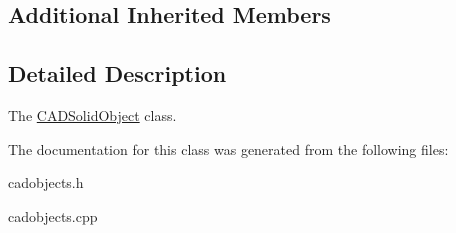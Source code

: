 \subsection*{Additional Inherited Members}


\subsection{Detailed Description}
The \hyperlink{class_c_a_d_solid_object}{C\+A\+D\+Solid\+Object} class. 

The documentation for this class was generated from the following files\+:\begin{DoxyCompactItemize}
\item 
cadobjects.\+h\item 
cadobjects.\+cpp\end{DoxyCompactItemize}
